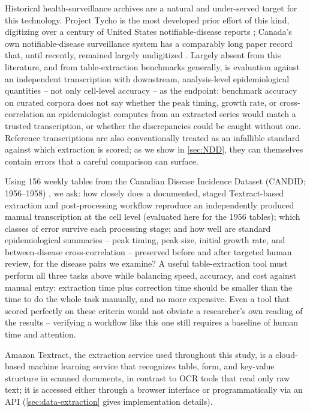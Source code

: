 \documentclass[12pt]{article}
\begin{document}
Historical health-surveillance archives are a natural and under-served target for this technology. Project Tycho is the most developed prior effort of this kind, digitizing over a century of United States notifiable-disease reports \cite{van2013contagious,van2018project}; Canada's own notifiable-disease surveillance system has a comparably long paper record that, until recently, remained largely undigitized \cite{sockett1996communicable,totten2019updates}. Largely absent from this literature, and from table-extraction benchmarks generally, is evaluation against an independent transcription with downstream, analysis-level epidemiological quantities -- not only cell-level accuracy -- as the endpoint: benchmark accuracy on curated corpora does not say whether the peak timing, growth rate, or cross-correlation an epidemiologist computes from an extracted series would match a trusted transcription, or whether the discrepancies could be caught without one. Reference transcriptions are also conventionally treated as an infallible standard against which extraction is scored; as we show in \cref{sec:NDD}, they can themselves contain errors that a careful comparison can surface.

Using 156 weekly tables from the Canadian Disease Incidence Dataset (CANDID; 1956--1958) \cite{CANDID}, we ask: how closely does a documented, staged Textract-based extraction and post-processing workflow reproduce an independently produced manual transcription at the cell level (evaluated here for the 1956 tables); which classes of error survive each processing stage; and how well are standard epidemiological summaries -- peak timing, peak size, initial growth rate, and between-disease cross-correlation -- preserved before and after targeted human review, for the disease pairs we examine? A useful table-extraction tool must perform all three tasks above while balancing speed, accuracy, and cost against manual entry: extraction time plus correction time should be smaller than the time to do the whole task manually, and no more expensive. Even a tool that scored perfectly on these criteria would not obviate a researcher's own reading of the results \cite{STADLER2024108386} -- verifying a workflow like this one still requires a baseline of human time and attention.

Amazon Textract, the extraction service used throughout this study, is a cloud-based machine learning service that recognizes table, form, and key-value structure in scanned documents, in contrast to OCR tools that read only raw text; it is accessed either through a browser interface or programmatically via an API (\cref{sec:data-extraction} gives implementation details).
\end{document}
